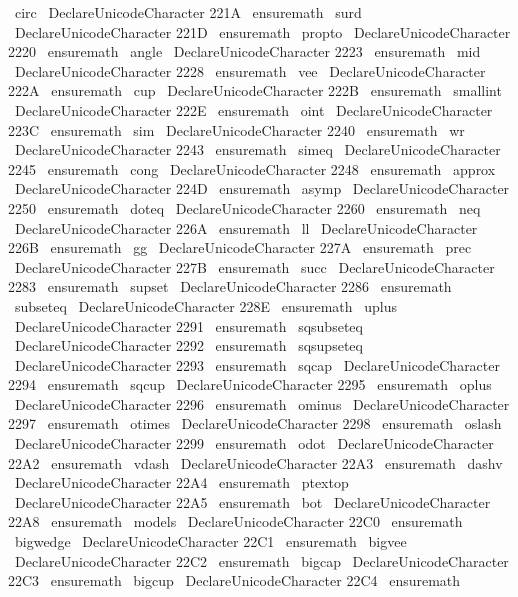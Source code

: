 {{{{{{\
circ
}
%
\
DeclareUnicodeCharacter
{
221A
}
{
\
ensuremath
\
surd
}
%
\
DeclareUnicodeCharacter
{
221D
}
{
\
ensuremath
\
propto
}
%
\
DeclareUnicodeCharacter
{
2220
}
{
\
ensuremath
\
angle
}
%
\
DeclareUnicodeCharacter
{
2223
}
{
\
ensuremath
\
mid
}
%
\
DeclareUnicodeCharacter
{
2228
}
{
\
ensuremath
\
vee
}
%
\
DeclareUnicodeCharacter
{
222A
}
{
\
ensuremath
\
cup
}
%
\
DeclareUnicodeCharacter
{
222B
}
{
\
ensuremath
\
smallint
}
%
\
DeclareUnicodeCharacter
{
222E
}
{
\
ensuremath
\
oint
}
%
\
DeclareUnicodeCharacter
{
223C
}
{
\
ensuremath
\
sim
}
%
\
DeclareUnicodeCharacter
{
2240
}
{
\
ensuremath
\
wr
}
%
\
DeclareUnicodeCharacter
{
2243
}
{
\
ensuremath
\
simeq
}
%
\
DeclareUnicodeCharacter
{
2245
}
{
\
ensuremath
\
cong
}
%
\
DeclareUnicodeCharacter
{
2248
}
{
\
ensuremath
\
approx
}
%
\
DeclareUnicodeCharacter
{
224D
}
{
\
ensuremath
\
asymp
}
%
\
DeclareUnicodeCharacter
{
2250
}
{
\
ensuremath
\
doteq
}
%
\
DeclareUnicodeCharacter
{
2260
}
{
\
ensuremath
\
neq
}
%
\
DeclareUnicodeCharacter
{
226A
}
{
\
ensuremath
\
ll
}
%
\
DeclareUnicodeCharacter
{
226B
}
{
\
ensuremath
\
gg
}
%
\
DeclareUnicodeCharacter
{
227A
}
{
\
ensuremath
\
prec
}
%
\
DeclareUnicodeCharacter
{
227B
}
{
\
ensuremath
\
succ
}
%
\
DeclareUnicodeCharacter
{
2283
}
{
\
ensuremath
\
supset
}
%
\
DeclareUnicodeCharacter
{
2286
}
{
\
ensuremath
\
subseteq
}
%
\
DeclareUnicodeCharacter
{
228E
}
{
\
ensuremath
\
uplus
}
%
\
DeclareUnicodeCharacter
{
2291
}
{
\
ensuremath
\
sqsubseteq
}
%
\
DeclareUnicodeCharacter
{
2292
}
{
\
ensuremath
\
sqsupseteq
}
%
\
DeclareUnicodeCharacter
{
2293
}
{
\
ensuremath
\
sqcap
}
%
\
DeclareUnicodeCharacter
{
2294
}
{
\
ensuremath
\
sqcup
}
%
\
DeclareUnicodeCharacter
{
2295
}
{
\
ensuremath
\
oplus
}
%
\
DeclareUnicodeCharacter
{
2296
}
{
\
ensuremath
\
ominus
}
%
\
DeclareUnicodeCharacter
{
2297
}
{
\
ensuremath
\
otimes
}
%
\
DeclareUnicodeCharacter
{
2298
}
{
\
ensuremath
\
oslash
}
%
\
DeclareUnicodeCharacter
{
2299
}
{
\
ensuremath
\
odot
}
%
\
DeclareUnicodeCharacter
{
22A2
}
{
\
ensuremath
\
vdash
}
%
\
DeclareUnicodeCharacter
{
22A3
}
{
\
ensuremath
\
dashv
}
%
\
DeclareUnicodeCharacter
{
22A4
}
{
\
ensuremath
\
ptextop
}
%
\
DeclareUnicodeCharacter
{
22A5
}
{
\
ensuremath
\
bot
}
%
\
DeclareUnicodeCharacter
{
22A8
}
{
\
ensuremath
\
models
}
%
\
DeclareUnicodeCharacter
{
22C0
}
{
\
ensuremath
\
bigwedge
}
%
\
DeclareUnicodeCharacter
{
22C1
}
{
\
ensuremath
\
bigvee
}
%
\
DeclareUnicodeCharacter
{
22C2
}
{
\
ensuremath
\
bigcap
}
%
\
DeclareUnicodeCharacter
{
22C3
}
{
\
ensuremath
\
bigcup
}
%
\
DeclareUnicodeCharacter
{
22C4
}
{
\
ensuremath
}}}}}}
